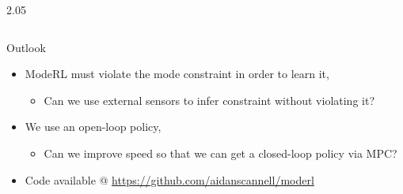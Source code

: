 \documentclass[final,11pt]{beamer}
\newlength{\colwidth}
\begin{document}
\begin{frame}[t]
\begin{columns}[t]
\begin{column}{2.05\colwidth}
\begin{columns}[t]
\begin{column}{\colwidth}
\begin{block}{Outlook}
  \begin{itemize}
    \item \alert{ModeRL} must violate the mode constraint in order to learn it,
    \begin{itemize}
      \item Can we use external sensors to infer constraint without violating it?
    \end{itemize}
    \item We use an open-loop policy,
    \begin{itemize}
      \item Can we improve speed so that we can get a closed-loop policy via MPC?
    \end{itemize}
    \item Code available @ \url{https://github.com/aidanscannell/moderl}
  \end{itemize}

  \end{block}

  \vspace*{1em}




\end{column}
\end{columns}
\end{column}
\end{columns}
\end{frame}
\end{document}
